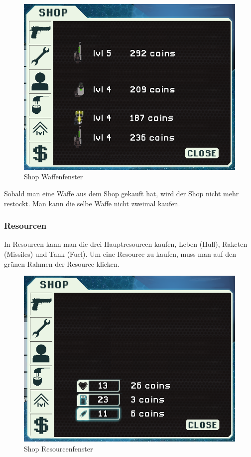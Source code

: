 \documentclass[fontsize=12pt,paper=a4,twoside]{scrartcl}
\begin{document}
\begin{figure}[H]
\centering
\includegraphics[width=1\linewidth]{DasSpiel/Shop/waffen.png}
\caption{Shop Waffenfenster}
\end{figure}

Sobald man eine Waffe aus dem Shop gekauft hat, wird der Shop nicht mehr restockt. Man kann die selbe Waffe nicht zweimal kaufen. 

\subsubsection{Resourcen}

In Resourcen kann man die drei Hauptresourcen kaufen, Leben (Hull), Raketen (Missiles) und Tank (Fuel). Um eine Resource zu kaufen, muss man auf den grünen Rahmen der Resource klicken. 


\begin{figure}[H]
\centering
\includegraphics[width=1\linewidth]{DasSpiel/Shop/resourcen.png}
\caption{Shop Resourcenfenster}
\end{figure}
\end{document}
